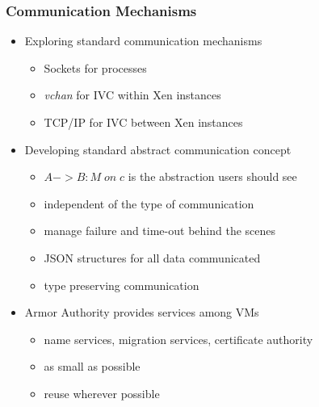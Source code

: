 \documentclass{beamer}
\begin{document}
\begin{frame}
  \frametitle{Communication Mechanisms}
  \begin{itemize}
  \item Exploring standard communication mechanisms
    \begin{itemize}
    \item Sockets for processes
    \item \emph{vchan} for IVC within Xen instances
    \item TCP/IP for IVC between Xen instances
    \end{itemize}
  \item Developing standard abstract communication concept
    \begin{itemize}
    \item $A->B:M\; on\; c$ is the abstraction users should see
    \item independent of the type of communication
    \item manage failure and time-out behind the scenes
    \item JSON structures for all data communicated
    \item type preserving communication
    \end{itemize}
  \item Armor Authority provides services among  VMs
    \begin{itemize}
    \item name services, migration services, certificate authority
    \item as small as possible
    \item reuse wherever possible
    \end{itemize}
  \end{itemize}
\end{frame}
\end{document}
